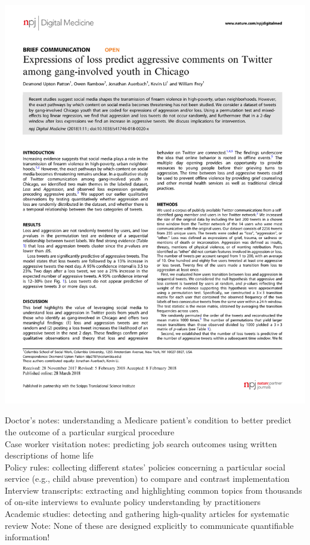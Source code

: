 \documentclass[smaller,xcolor=table,aspectratio=169]{beamer}
\begin{document}
\begin{frame}
  \includegraphics[page=1,height=0.5\textheight]{images/patton-npj-2018.pdf}

  Doctor's notes:  understanding a Medicare patient's condition to better predict the outcome of a particular surgical procedure\\
  Case worker visitation notes:  predicting job search outcomes using written descriptions of home life\\
  Policy rules:  collecting different states' policies concerning a particular social service (e.g., child abuse prevention) to compare and contrast implementation\\
  Interview transcripts:  extracting and highlighting common topics from thousands of on-site interviews to evaluate policy understanding by practitioners\\
  Academic studies:  detecting and gathering high-quality articles for systematic review
  \vfill{}
  Note: None of these are designed explicitly to communicate quantifiable information!
\end{frame}
\end{document}
